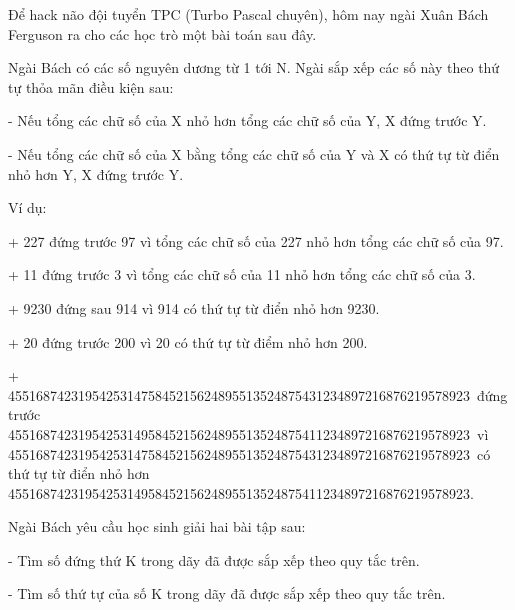 Để hack não đội tuyển TPC (Turbo Pascal chuyên), hôm nay ngài Xuân Bách Ferguson ra cho các học trò một bài toán sau đây.

Ngài Bách có các số nguyên dương từ 1 tới N. Ngài sắp xếp các số này theo thứ tự thỏa mãn điều kiện sau:

- Nếu tổng các chữ số của X nhỏ hơn tổng các chữ số của Y, X đứng trước Y.

- Nếu tổng các chữ số của X bằng tổng các chữ số của Y và X có thứ tự từ điển nhỏ hơn Y, X đứng trước Y.

Ví dụ:

+ 227 đứng trước 97 vì tổng các chữ số của 227 nhỏ hơn tổng các chữ số của 97.

+ 11 đứng trước 3 vì tổng các chữ số của 11 nhỏ hơn tổng các chữ số của 3.

+ 9230 đứng sau 914 vì 914 có thứ tự từ điển nhỏ hơn 9230.

+ 20 đứng trước 200 vì 20 có thứ tự từ điểm nhỏ hơn 200.

+ 455168742319542531475845215624895513524875431234897216876219578923 đứng trước 455168742319542531495845215624895513524875411234897216876219578923 vì 455168742319542531475845215624895513524875431234897216876219578923 có thứ tự từ điển nhỏ hơn 455168742319542531495845215624895513524875411234897216876219578923.

Ngài Bách yêu cầu học sinh giải hai bài tập sau:

- Tìm số đứng thứ K trong dãy đã được sắp xếp theo quy tắc trên.

- Tìm số thứ tự của số K trong dãy đã được sắp xếp theo quy tắc trên.